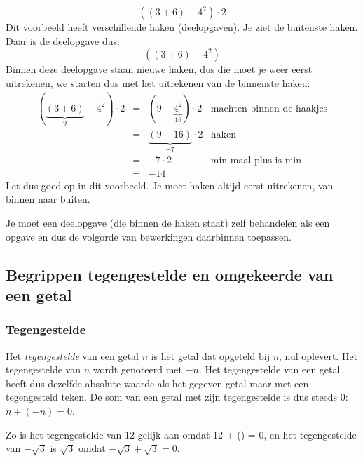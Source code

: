 \begin{voorbeeld}
\begin{equation*}
((3+6)-4^2)\cdot 2
\end{equation*}
Dit voorbeeld heeft verschillende haken (deelopgaven). Je ziet de buitenste haken. Daar is de deelopgave dus:
\begin{equation*}
((3+6)-4^2)
\end{equation*}
Binnen deze deelopgave staan nieuwe haken, dus die moet je weer eerst uitrekenen, we starten dus met het uitrekenen van de binnenste haken:
\begin{equation*}
\begin{array}{cclr}
\left( \underbrace{(3+6)}_{9}-4^2\right)\cdot 2 &=& \left( 9-\underbrace{4^2}_{16}\right)\cdot 2 & \text{machten binnen de haakjes} \\
&=& \underbrace{(9-16)}_{-7}\cdot 2 & \text{haken} \\
&=& -7 \cdot 2 & \text{min maal plus is min} \\
&=& -14
\end{array}
\end{equation*}
Let dus goed op in dit voorbeeld. Je moet haken altijd eerst uitrekenen, van binnen naar buiten.

Je moet een deelopgave (die binnen de haken staat) zelf behandelen als een opgave en dus de volgorde van bewerkingen daarbinnen toepassen.

\end{voorbeeld}
\subsection{Begrippen tegengestelde en omgekeerde van een getal}

\subsubsection{Tegengestelde}

Het \emph{tegengestelde} van een getal $n$ is het getal dat opgeteld
bij $n$, nul oplevert. Het tegengestelde van $n$ wordt genoteerd met
$-n$. Het tegengestelde van een getal heeft dus dezelfde absolute
waarde als het gegeven getal maar met een tegengesteld teken. De som
van een getal met zijn tegengestelde is dus steeds 0: $n+(-n)=0$.

Zo is het tegengestelde van 12 gelijk aan 
omdat 12 + () = 0, en het tegengestelde van $-\sqrt{3}$
is $\sqrt{3}$ omdat $-\sqrt{3}+\sqrt{3}=0$.

